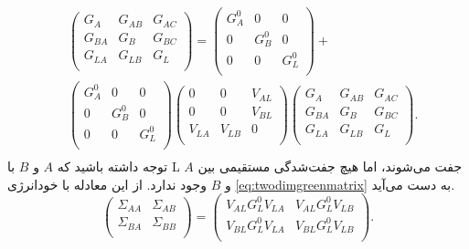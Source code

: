 \begin{equation}
    \begin{aligned}
          & \left( \begin{matrix}
           {{G}_{A}} & {{G}_{AB}} & {{G}_{AC}}  \\
           {{G}_{BA}} & {{G}_{B}} & {{G}_{BC}}  \\
           {{G}_{LA}} & {{G}_{LB}} & {{G}_{L}}  \\
        \end{matrix} \right)=\left( \begin{matrix}
           G_{A}^{0} & 0 & 0  \\
           0 & G_{B}^{0} & 0  \\
           0 & 0 & G_{L}^{0}  \\
        \end{matrix} \right)+ \\ 
         & \left( \begin{matrix}
           G_{A}^{0} & 0 & 0  \\
           0 & G_{B}^{0} & 0  \\
           0 & 0 & G_{L}^{0}  \\
        \end{matrix} \right)\left( \begin{matrix}
           0 & 0 & {{V}_{AL}}  \\
           0 & 0 & {{V}_{BL}}  \\
           {{V}_{LA}} & {{V}_{LB}} & 0  \\
        \end{matrix} \right)\left( \begin{matrix}
           {{G}_{A}} & {{G}_{AB}} & {{G}_{AC}}  \\
           {{G}_{BA}} & {{G}_{B}} & {{G}_{BC}}  \\
           {{G}_{LA}} & {{G}_{LB}} & {{G}_{L}}  \\
        \end{matrix} \right). \\ 
    \end{aligned}
    \label{eq:expandmultigrren}
\end{equation}
توجه داشته باشید که $A$ و $B$ با L جفت می‌شوند، اما هیچ جفت‌شدگی مستقیمی بین $A$ و $B$ وجود ندارد. از این معادله با خودانرژی \ref{eq:twodimgreenmatrix} به دست می‌آید.
\begin{equation}
    \left( \begin{matrix}
           {{\Sigma }_{AA}} & {{\Sigma }_{AB}}  \\
           {{\Sigma }_{BA}} & {{\Sigma }_{BB}}  \\
        \end{matrix} \right)=\left( \begin{matrix}
           {{V}_{AL}}G_{L}^{0}{{V}_{LA}} & {{V}_{AL}}G_{L}^{0}{{V}_{LB}}  \\
           {{V}_{BL}}G_{L}^{0}{{V}_{LA}} & {{V}_{BL}}G_{L}^{0}{{V}_{LB}}  \\
        \end{matrix} 
    \right).
\end{equation}
